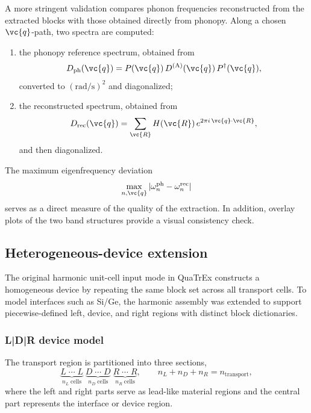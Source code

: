 A more stringent validation compares phonon frequencies reconstructed
from the extracted blocks with those obtained directly from phonopy.
Along a chosen $\vc{q}$-path, two spectra are computed:
\begin{enumerate}
  \item the phonopy reference spectrum, obtained from
        \begin{equation}
          D_\mathrm{ph}(\vc{q})
          = P(\vc{q})\,D^{(\mathrm{A})}(\vc{q})\,P^\dagger(\vc{q}),
        \end{equation}
        converted to $(\mathrm{rad/s})^2$ and diagonalized;

  \item the reconstructed spectrum, obtained from
        \begin{equation}
          D_\mathrm{rec}(\vc{q})
          = \sum_{\vc{R}} H(\vc{R})\,
            e^{2\pi i\,\vc{q}\cdot\vc{R}},
        \end{equation}
        and then diagonalized.
\end{enumerate}
The maximum eigenfrequency deviation
\begin{equation}
  \max_{n,\vc{q}}
  |\omega_n^\mathrm{ph} - \omega_n^\mathrm{rec}|
\end{equation}
serves as a direct measure of the quality of the extraction.  In
addition, overlay plots of the two band structures provide a visual
consistency check.

\subsection{Heterogeneous-device extension}
\label{sec:heterogeneous}

The original harmonic unit-cell input mode in QuaTrEx constructs a
homogeneous device by repeating the same block set across all transport
cells.  To model interfaces such as Si/Ge, the harmonic assembly was
extended to support piecewise-defined left, device, and right regions
with distinct block dictionaries.

\subsubsection{L|D|R device model}

The transport region is partitioned into three sections,
\begin{equation}\label{eq:ldr}
  \underbrace{L\;\cdots\;L}_{n_L\;\text{cells}}
  \;\underbrace{D\;\cdots\;D}_{n_D\;\text{cells}}
  \;\underbrace{R\;\cdots\;R}_{n_R\;\text{cells}},
  \qquad
  n_L + n_D + n_R = n_\mathrm{transport},
\end{equation}
where the left and right parts serve as lead-like material regions and
the central part represents the interface or device region.

